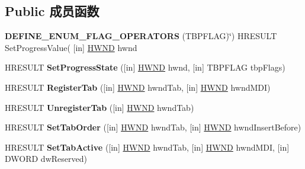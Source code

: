 \subsection*{Public 成员函数}
\begin{DoxyCompactItemize}
\item 
\mbox{\label{interface_i_taskbar_list3_ab5098e029a489df4159ff075faf6ae9f}} 
{\bfseries D\+E\+F\+I\+N\+E\+\_\+\+E\+N\+U\+M\+\_\+\+F\+L\+A\+G\+\_\+\+O\+P\+E\+R\+A\+T\+O\+RS} (T\+B\+P\+F\+L\+AG)\char`\"{}) H\+R\+E\+S\+U\+LT Set\+Progress\+Value( \mbox{[}in\mbox{]} \hyperlink{interfacevoid}{H\+W\+ND} hwnd
\item 
\mbox{\label{interface_i_taskbar_list3_a976cc2cc89e2e80a5a94e3da4bbf7993}} 
H\+R\+E\+S\+U\+LT {\bfseries Set\+Progress\+State} (\mbox{[}in\mbox{]} \hyperlink{interfacevoid}{H\+W\+ND} hwnd, \mbox{[}in\mbox{]} T\+B\+P\+F\+L\+AG tbp\+Flags)
\item 
\mbox{\label{interface_i_taskbar_list3_a5f63317a6baf0dca11af0c307277ef0f}} 
H\+R\+E\+S\+U\+LT {\bfseries Register\+Tab} (\mbox{[}in\mbox{]} \hyperlink{interfacevoid}{H\+W\+ND} hwnd\+Tab, \mbox{[}in\mbox{]} \hyperlink{interfacevoid}{H\+W\+ND} hwnd\+M\+DI)
\item 
\mbox{\label{interface_i_taskbar_list3_aeaaa0701a73055a96500ebc8089546c5}} 
H\+R\+E\+S\+U\+LT {\bfseries Unregister\+Tab} (\mbox{[}in\mbox{]} \hyperlink{interfacevoid}{H\+W\+ND} hwnd\+Tab)
\item 
\mbox{\label{interface_i_taskbar_list3_a1faeee691190097f4fd112348a576fcc}} 
H\+R\+E\+S\+U\+LT {\bfseries Set\+Tab\+Order} (\mbox{[}in\mbox{]} \hyperlink{interfacevoid}{H\+W\+ND} hwnd\+Tab, \mbox{[}in\mbox{]} \hyperlink{interfacevoid}{H\+W\+ND} hwnd\+Insert\+Before)
\item 
\mbox{\label{interface_i_taskbar_list3_abe63e85d20e43d1d33c0798d0220d772}} 
H\+R\+E\+S\+U\+LT {\bfseries Set\+Tab\+Active} (\mbox{[}in\mbox{]} \hyperlink{interfacevoid}{H\+W\+ND} hwnd\+Tab, \mbox{[}in\mbox{]} \hyperlink{interfacevoid}{H\+W\+ND} hwnd\+M\+DI, \mbox{[}in\mbox{]} D\+W\+O\+RD dw\+Reserved)
\item 
\mbox{\label{interface_i_taskbar_list3_aeee3d306428a2a3e0aa0c9ed564a8218}} 

\end{DoxyCompactItemize}
